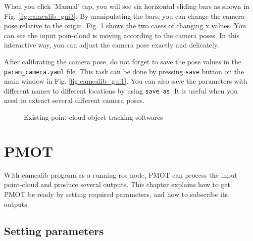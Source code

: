 \documentclass[a4paper,twoside, openright,12pt]{report}
\begin{document}
When you click 'Manual' tap, you will see six horizontal sliding bars as shown in Fig. \ref{fig:camcalib_gui3}.
By manipulating the bars, you can change the camera pose relative to the origin. Fig. \ref{fig:camcalib_manip} shows the two cases of changing x values. You can see the input poin-cloud is moving according to the camera poses. In this interactive way, you can adjust the camera pose exactly and delicately. 

After calibrating the camera pose, do not forget to save the pose values in the \verb|param_camera.yaml| file. This task can be done by pressing \verb|save| button on the main window in Fig. \ref{fig:camcalib_gui1}. You can also save the parameters with different names to different locations by using \verb|save as|. It is useful when you need to extract several different camera poses. 

\begin{figure}[b]
	\centering
	\hfil
	\caption{Existing point-cloud object tracking softwares}
	\label{fig:camcalib_manip}
\end{figure}

\section{PMOT}

With camcalib program as a running ros node, PMOT can process the input point-cloud and produce several outputs. This chapter explains how to get PMOT be ready by setting required parameters, and how to subscribe its outputs. 

\subsection{Setting parameters}
\end{document}
